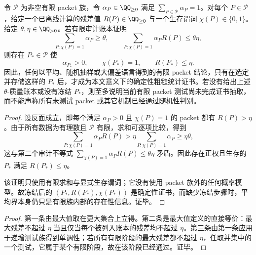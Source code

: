 \begin{proposition}\label{prop:distill-bourgain-frt-finite-packet-freezing-extraction}
令 \(\mathcal P\) 为非空有限 packet 族，令 \(\alpha_P\in\QQ_{\ge0}\) 满足 \(\sum_{P\in\mathcal P}\alpha_P=1\)。对每个 \(P\in\mathcal P\)，给定一个已离线计算的残差值 \(R(P)\in\QQ_{\ge0}\) 与一个生存谓词 \(\chi(P)\in\{0,1\}\)。给定 \(\theta,\eta\in\QQ_{>0}\)。若有限审计账本证明
\[
\sum_{P:\chi(P)=1}\alpha_P\ge\theta,
\qquad
\sum_{P:\chi(P)=1}\alpha_P R(P)\le\theta\eta,
\]
则存在 \(P_\ast\in\mathcal P\) 使
\[
\alpha_{P_\ast}>0,\qquad \chi(P_\ast)=1,\qquad R(P_\ast)\le\eta.
\]
因此，任何以平均、随机抽样或大偏差语言得到的有限 packet 结论，只有在选定并存储这样的 \(P_\ast\) 后，才成为本文意义下的确定性粗糙统计证书。若没有给出上述 \(\theta\)-质量账本或没有冻结 \(P_\ast\)，则至多说明当前有限 packet 测试尚未完成证书抽取，而不能声称所有未测试 packet 或其它机制已经通过随机性判别。
\end{proposition}
\begin{proof}
设反面成立，即每个满足 \(\alpha_P>0\) 且 \(\chi(P)=1\) 的 packet 都有 \(R(P)>\eta\)。由于所有数据为有理数且 \(\mathcal P\) 有限，求和可逐项比较，得到
\[
\sum_{P:\chi(P)=1}\alpha_P R(P)
>
\eta\sum_{P:\chi(P)=1}\alpha_P
\ge
\eta\theta,
\]
这与第二个审计不等式 \(\sum_{\chi(P)=1}\alpha_P R(P)\le\theta\eta\) 矛盾。因此存在正权且生存的 \(P_\ast\) 满足 \(R(P_\ast)\le\eta\)。

该证明只使用有限求和与显式生存谓词；它没有使用 packet 族外的任何概率模型。故冻结后的 \((P_\ast,R(P_\ast),\chi(P_\ast))\) 是确定性证书，而缺少冻结步骤时，平均界本身仍只是有限族内部的存在性信息。证毕。
\end{proof}

\begin{proof}
第一条由最大值取在更大集合上立得。第二条是最大值定义的直接等价：最大残差不超过 \(\eta\) 当且仅当每个被列入账本的残差均不超过 \(\eta\)。第三条由第一条应用于递增测试族得到单调性；若所有有限阶段的最大残差都不超过 \(\eta\)，任取并集中的一个测试，它属于某个有限阶段，故在该阶段已经通过。证毕。
\end{proof}

